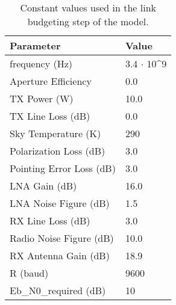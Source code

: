 \begin{table}[!ht]
\centering
\begin{tabular}{|p{}|p{}|}
\hline
\textbf{Parameter}      & \textbf{Value}            \\ \hline
frequency (Hz)          & 3.4 $\cdot$ 10\textasciicircum{}9
\\ \hline
Aperture Efficiency     & 0.0                       \\ \hline
TX Power (W)            & 10.0                      \\ \hline
TX Line Loss (dB)       & 0.0                       \\ \hline
Sky Temperature (K)      & 290                       \\ \hline
Polarization Loss (dB)   & 3.0                       \\ \hline
Pointing Error Loss (dB)  & 3.0                       \\ \hline
LNA Gain (dB)           & 16.0                      \\ \hline
LNA Noise Figure (dB)   & 1.5                       \\ \hline
RX Line Loss (dB)       & 3.0                       \\ \hline
Radio Noise Figure (dB) & 10.0                      \\ \hline
RX Antenna Gain (dB)    & 18.9                      \\ \hline
R (baud)                & 9600                      \\ \hline
Eb\_N0\_required (dB)   & 10                        \\ \hline
\end{tabular}
\vspace{2 mm}
\caption{Constant values used in the link budgeting step of the model.}
\label{DownlinkParameters}
\end{table}


